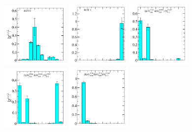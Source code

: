 \begin{figure}
  \includegraphics[width=0.3\textwidth]{figures/spectrum_a1gm/no_tq/zfactors/zfactor_isotriplet-S0-P000-A1gm_1-ROT-0.pdf}
  \includegraphics[width=0.28\textwidth]{figures/spectrum_a1gm/no_tq/zfactors/zfactor_isotriplet-S0-P000-A1gm_1-ROT-1.pdf}
  \includegraphics[width=0.28\textwidth]{figures/spectrum_a1gm/no_tq/zfactors/zfactor_isotriplet_phi_pion-A1gm_1-P000-A1up-SS_0-P000-A1um-SS_0.pdf}\\
  \includegraphics[width=0.3\textwidth]{figures/spectrum_a1gm/no_tq/zfactors/zfactor_isotriplet_eta_pion-A1gm_1-P000-A1up-SS_0-P000-A1um-SS_0.pdf}
  \includegraphics[width=0.28\textwidth]{figures/spectrum_a1gm/no_tq/zfactors/zfactor_isotriplet_kaon_kbar-A1gm_1-P000-A1u-SS_0-P000-A1u-SS_0.pdf}

\end{figure}
